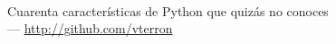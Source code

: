 {

\begin{frame}[plain]
  \vspace{6.25cm}
  \begin{TitleBox}
    {\LARGE \inserttitle} \\
    {\small Cuarenta características de Python que \textcolor{darkerred}{quizás} no conoces \\
     \insertauthor \enspace --- \thinspace \url{http://github.com/vterron}}
  \end{TitleBox}
\end{frame}
}
